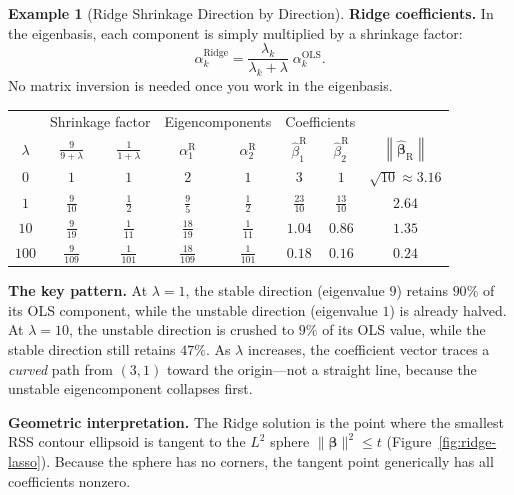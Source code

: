\documentclass[11pt,a4paper]{article}
\theoremstyle{plain}
\theoremstyle{definition}
\newtheorem{example}[theorem]{Example}
\newcommand{\bhat}{\hat{\bm{\beta}}}
\newcommand{\norm}[1]{\left\lVert #1 \right\rVert}
\begin{document}
\begin{example}[Ridge Shrinkage Direction by Direction]
\medskip\noindent\textbf{Ridge coefficients.}
In the eigenbasis, each component is simply multiplied by a shrinkage
factor:
\[
\alpha_k^{\text{Ridge}}
= \frac{\lambda_k}{\lambda_k + \lambda}\;\alpha_k^{\text{OLS}}.
\]
No matrix inversion is needed once you work in the eigenbasis.

\begin{center}
\renewcommand{\arraystretch}{1.4}
\begin{tabular}{c|cc|cc|cc|c}
\toprule
& \multicolumn{2}{c|}{Shrinkage factor}
& \multicolumn{2}{c|}{Eigencomponents}
& \multicolumn{2}{c|}{Coefficients} & \\
$\lambda$
& $\frac{9}{9+\lambda}$ & $\frac{1}{1+\lambda}$
& $\alpha_1^{\text{R}}$ & $\alpha_2^{\text{R}}$
& $\hat\beta_1^{\text{R}}$ & $\hat\beta_2^{\text{R}}$
& $\norm{\bhat_{\text{R}}}$ \\
\midrule
$0$   & $1$ & $1$
      & $2$ & $1$
      & $3$ & $1$
      & $\sqrt{10}\approx 3.16$ \\[2pt]
$1$   & $\frac{9}{10}$ & $\frac{1}{2}$
      & $\frac{9}{5}$ & $\frac{1}{2}$
      & $\frac{23}{10}$ & $\frac{13}{10}$
      & $2.64$ \\[2pt]
$10$  & $\frac{9}{19}$ & $\frac{1}{11}$
      & $\frac{18}{19}$ & $\frac{1}{11}$
      & $1.04$ & $0.86$
      & $1.35$ \\[2pt]
$100$ & $\frac{9}{109}$ & $\frac{1}{101}$
      & $\frac{18}{109}$ & $\frac{1}{101}$
      & $0.18$ & $0.16$
      & $0.24$ \\
\bottomrule
\end{tabular}
\end{center}

\medskip\noindent\textbf{The key pattern.}
At $\lambda=1$, the stable direction (eigenvalue $9$) retains $90\%$ of
its OLS component, while the unstable direction (eigenvalue $1$) is
already halved.
At $\lambda=10$, the unstable direction is crushed to $9\%$ of its OLS
value, while the stable direction still retains $47\%$.
As $\lambda$ increases, the coefficient vector traces a \emph{curved}
path from $(3,1)$ toward the origin---not a straight line, because
the unstable eigencomponent collapses first.
\end{example}


\medskip
\noindent\textbf{Geometric interpretation.}
The Ridge solution is the point where the smallest RSS contour
ellipsoid is tangent to the $L^2$ sphere
$\|\bm{\beta}\|^2 \le t$ (Figure~\ref{fig:ridge-lasso}).
Because the sphere has no corners, the tangent point generically
has all coefficients nonzero.
\end{document}
